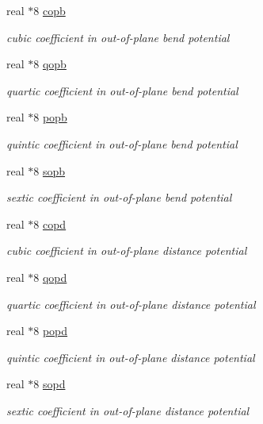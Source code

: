 \begin{DoxyCompactItemize}
real $\ast$8 \hyperlink{classangpot_afce14bd92562300f4affafe4a4f54ed2}{copb}
\begin{DoxyCompactList}\small\item\em cubic coefficient in out-\/of-\/plane bend potential \end{DoxyCompactList}\item 
real $\ast$8 \hyperlink{classangpot_ab17a7fab62bdf6365808195f222ec7e0}{qopb}
\begin{DoxyCompactList}\small\item\em quartic coefficient in out-\/of-\/plane bend potential \end{DoxyCompactList}\item 
real $\ast$8 \hyperlink{classangpot_a66f43101158f734ab9c9ded47d17bb45}{popb}
\begin{DoxyCompactList}\small\item\em quintic coefficient in out-\/of-\/plane bend potential \end{DoxyCompactList}\item 
real $\ast$8 \hyperlink{classangpot_aecbb251975c3a907d275722e8e6a60bd}{sopb}
\begin{DoxyCompactList}\small\item\em sextic coefficient in out-\/of-\/plane bend potential \end{DoxyCompactList}\item 
real $\ast$8 \hyperlink{classangpot_af0b77277ecab0114f05807cbea726048}{copd}
\begin{DoxyCompactList}\small\item\em cubic coefficient in out-\/of-\/plane distance potential \end{DoxyCompactList}\item 
real $\ast$8 \hyperlink{classangpot_a9e0aceb949135ec0ff7e28f4908549f9}{qopd}
\begin{DoxyCompactList}\small\item\em quartic coefficient in out-\/of-\/plane distance potential \end{DoxyCompactList}\item 
real $\ast$8 \hyperlink{classangpot_a924ee1ac145c598a491ee414b7434ab4}{popd}
\begin{DoxyCompactList}\small\item\em quintic coefficient in out-\/of-\/plane distance potential \end{DoxyCompactList}\item 
real $\ast$8 \hyperlink{classangpot_af3dd83fc43152e637659439b3b568f8c}{sopd}
\begin{DoxyCompactList}\small\item\em sextic coefficient in out-\/of-\/plane distance potential \end{DoxyCompactList}\end{DoxyCompactItemize}


